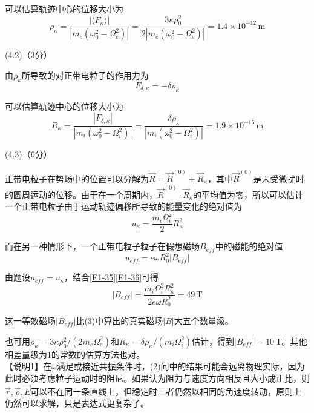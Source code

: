 \documentclass[10pt,a4paper,onecolumn,UTF8]{ctexart}
\begin{document}
	可以估算轨迹中心的位移大小为
	\begin{equation}\label{E1-32}
		\rho_{\kappa}=\frac{|\langle F_{\kappa}\rangle|}{|m_e(\omega_0^2-\Omega_e^2)|}=\frac{3\kappa\rho_0^2}{2|m_e(\omega_0^2-\Omega_e^2)|}=1.4\times10^{-12}\,\text{m}
	\end{equation}
	
	(4.2)（3分）
	
	由$\rho_{\kappa}$所导致的对正带电粒子的作用力为
	\begin{equation}\label{E1-33}
		F_{\delta,\kappa}=-\delta\rho_{\kappa}
	\end{equation}
	
	可以估算轨迹中心的位移大小为
	\begin{equation}\label{E1-34}
		R_{\kappa}=\frac{|F_{\delta,\kappa}|}{|m_i(\omega_0^2-\Omega_i^2)|}=\frac{\delta\rho_{\kappa}}{|m_i(\omega_0^2-\Omega_i^2)|}=1.9\times10^{-15}\,\text{m}
	\end{equation}
	
	(4.3)（6分）
	
	正带电粒子在势场中的位置可以分解为$\vec R=\vec R^{(0)}+\vec R_{\kappa}$，其中$\vec R^{(0)}$是未受微扰时的圆周运动的位移。由于在一个周期内，$\vec R^{(0)}\cdot\vec R_{\kappa}$的平均值为零，所以可以估计一个正带电粒子由于运动轨迹偏移所导致的能量变化的绝对值为
	\begin{equation}\label{E1-35}
		u_{\kappa}=\frac{m_i\Omega_i^2}{2}R_{\kappa}^2
	\end{equation}
	
	而在另一种情形下，一个正带电粒子粒子在假想磁场$B_{eff}$中的磁能的绝对值
	\begin{equation}\label{E1-36}
		u_{eff}=e\omega R_0^2 |B_{eff}|
	\end{equation}
	
	由题设$u_{eff}=u_{\kappa}$，结合\eqref{E1-35}\eqref{E1-36}可得
	\begin{equation}
		|B_{eff}|=\frac{m_i\Omega_i^2R_{\kappa}^2}{2e\omega R_0^2}=49\,\text{T}
	\end{equation}
	
	这一等效磁场$|B_{eff}|$比(3)中算出的真实磁场$|B|$大五个数量级。
	
		
	也可用$\rho_{\kappa}=3\kappa\rho_0^2/(2m_e\Omega_e^2)$和$R_{\kappa}=\delta\rho_{\kappa}/(m_i\Omega_i^2)$估计，得到$|B_{eff}|=10\,\text{T}$。其他相差量级为1的常数的估算方法也对。\\
	
	【说明1】在$\omega$满足或接近共振条件时，(2)问中的结果可能会远离物理实际，因为此时必须考虑粒子运动时的阻尼。如果认为阻力与速度方向相反且大小成正比，则$\vec r,\vec\rho,\vec E$可以不在同一条直线上，但稳定时三者仍然以相同的角速度转动，原则上仍然可以求解，只是表达式更复杂了。
	
\end{document}
